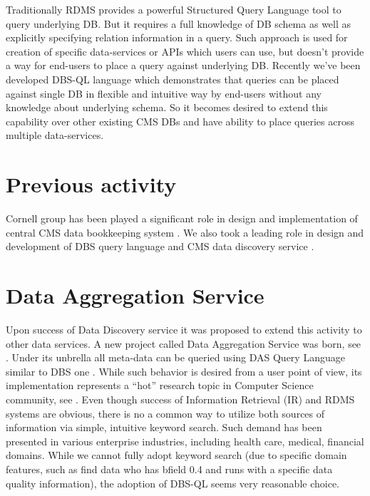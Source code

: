 \documentclass[a4paper]{jpconf}
\begin{document}
Traditionally RDMS provides a powerful Structured Query Language tool to
query underlying DB. But it requires a full knowledge of DB schema as well
as explicitly specifying relation information in a query. Such approach is
used for creation of specific data-services or APIs which users can use,
but doesn't provide a way for end-users to place a query against
underlying DB. Recently we've been developed DBS-QL language \cite{DBSQL}
which demonstrates that queries can be placed against single DB in
flexible and intuitive way by end-users without any knowledge about
underlying schema. So it becomes desired to extend
this capability over other existing CMS DBs and have ability to
place queries across multiple data-services.

\section{Previous activity}
Cornell group has been played a significant role in design and implementation of
central CMS data bookkeeping system \cite{DBS}. 
We also took a leading role in design and 
development of DBS query language \cite{DBSQL, DBS07} and CMS data discovery
service \cite{DD}.

\section{Data Aggregation Service}
Upon success of Data Discovery service \cite{DD} it was proposed
to extend this activity to other data services. A new project called
Data Aggregation Service was born, see \cite{DAS}. Under its unbrella
all meta-data can be queried using DAS Query Language similar to
DBS one \cite{DBSQL}. While such behavior is desired from  a user point of
view, its implementation represents a ``hot'' research topic in
Computer Science community, see \cite{Arms, DBXplorer, QueryAnswer, FedDB}.
Even though success of Information Retrieval (IR) and RDMS systems
are obvious, there is no a common way to utilize both sources of
information via simple, intuitive keyword search. Such demand has
been presented in various enterprise industries,
including health care, medical, financial domains.
While we cannot fully adopt keyword search (due to specific
domain features, such as find data who has bfield 0.4 and runs with
a specific data quality information), the adoption of DBS-QL
seems very reasonable choice.
\end{document}
